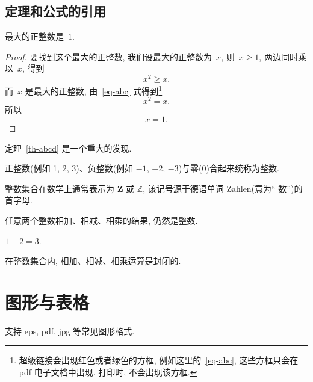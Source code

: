 \documentclass{ice_report}  %
\begin{document}
\subsection{定理和公式的引用}

\begin{theorem}[谁发现的]\label{th-abcd}
最大的正整数是~$1$.
\end{theorem}

\begin{proof}
要找到这个最大的正整数, 我们设最大的正整数为~$x$, 则~$x \geqslant 1$, 两边同时乘以~$x$, 得到
\begin{equation}\label{eq-abc}
x^2 \geqslant x.
\end{equation}
而~$x$ 是最大的正整数, 由~\eqref{eq-abc} 式得到\footnote{超级链接会出现红色或者绿色的方框, 例如这里的~\eqref{eq-abc}, 这些方框只会在 pdf 电子文档中出现. 打印时, 不会出现该方框.}
\[
x^2 = x.
\]
所以
\begin{equation*}
x = 1.
\end{equation*}
\end{proof}

定理~\ref{th-abcd} 是一个重大的发现.

\begin{definition}[整数]
 正整数(例如 1, 2, 3)、负整数(例如 ${−1}$, $−2$, $−3$)与零(0)合起来统称为{\heiti 整数}.
\end{definition}

\begin{remark}
  整数集合在数学上通常表示为 $\mathbf{Z}$ 或 $\mathbb{Z}$, 该记号源于德语单词 Zahlen(意为`` 数'')的首字母.
\end{remark}

\begin{proposition}
任意两个整数相加、相减、相乘的结果, 仍然是整数.
\end{proposition}

\begin{example}
  $1+2=3$.
\end{example}

\begin{corollary}
   在整数集合内, 相加、相减、相乘运算是封闭的.
\end{corollary}

\section{图形与表格}

支持 eps, pdf, jpg 等常见图形格式.
\end{document}
